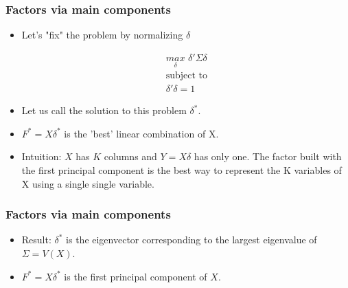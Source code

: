 \documentclass[
  shownotes,
  xcolor={svgnames},
  hyperref={colorlinks,citecolor=DarkBlue,linkcolor=DarkRed,urlcolor=DarkBlue}
  , aspectratio=169]{beamer}
\begin{document}
\begin{frame}
\frametitle{Factors via main components}

\begin{itemize}
\item Let's "fix" the problem by normalizing $\delta$

\begin{align}
\underset{\delta}{max}\,\, \delta' \Sigma \delta \\ \nonumber
\text{subject to}  \\ \nonumber
\delta' \delta = 1 \nonumber
\end{align}
\item Let us call the solution to this problem $\delta^*$. 
\medskip
\item $F^* = X\delta^*$ is the 'best' linear combination of X. 
\medskip
\item Intuition: $X$ has $K$ columns and $Y = X\delta$ has only one. The factor built with the first principal component is the best way to represent the K variables of X using a single single variable.
\end{itemize}
\end{frame}

\begin{frame}
\frametitle{Factors via main components}

\begin{itemize}
\item Result: $\delta^*$ is the eigenvector corresponding to the largest eigenvalue of $\Sigma = V (X)$.
\medskip
\item $F^* = X\delta^*$ is the first principal component of $X$.
\medskip

\end{itemize}

\end{frame}
\end{document}
